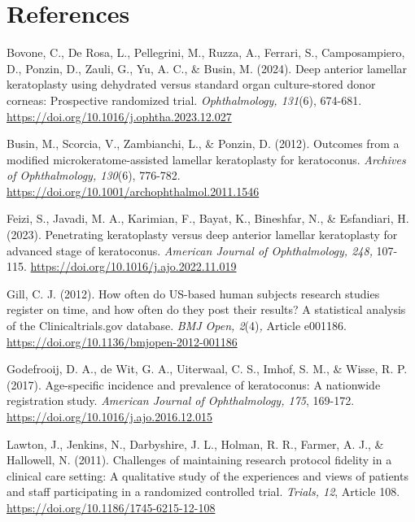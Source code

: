 \documentclass[authordate, reflection,issue]{jote-new-article}
\begin{document}
	\section{References}



	Bovone, C., De Rosa, L., Pellegrini, M., Ruzza, A., Ferrari, S., Camposampiero, D., Ponzin, D., Zauli, G., Yu, A. C., \& Busin, M. (2024). Deep anterior lamellar keratoplasty using dehydrated versus standard organ culture-stored donor corneas: Prospective randomized trial. \emph{Ophthalmology, 131}(6), 674-681. \url{https://doi.org/10.1016/j.ophtha.2023.12.027}



	Busin, M., Scorcia, V., Zambianchi, L., \& Ponzin, D. (2012). Outcomes from a modified microkeratome-assisted lamellar keratoplasty for keratoconus. \emph{Archives of Ophthalmology, 130}(6), 776-782. \url{https://doi.org/10.1001/archophthalmol.2011.1546}



	Feizi, S., Javadi, M. A., Karimian, F., Bayat, K., Bineshfar, N., \& Esfandiari, H. (2023). Penetrating keratoplasty versus deep anterior lamellar keratoplasty for advanced stage of keratoconus. \emph{American Journal of Ophthalmology, 248, }107-115. \url{https://doi.org/10.1016/j.ajo.2022.11.019}



	Gill, C. J. (2012). How often do US-based human subjects research studies register on time, and how often do they post their results? A statistical analysis of the Clinicaltrials.gov database. \emph{BMJ Open, 2}(4)\emph{, }Article e001186. \url{https://doi.org/10.1136/bmjopen-2012-001186}



	Godefrooij, D. A., de Wit, G. A., Uiterwaal, C. S., Imhof, S. M., \& Wisse, R. P. (2017). Age-specific incidence and prevalence of keratoconus: A nationwide registration study. \emph{American Journal of Ophthalmology, 175}, 169-172. \url{https://doi.org/10.1016/j.ajo.2016.12.015}



	Lawton, J., Jenkins, N., Darbyshire, J. L., Holman, R. R., Farmer, A. J., \& Hallowell, N. (2011). Challenges of maintaining research protocol fidelity in a clinical care setting: A qualitative study of the experiences and views of patients and staff participating in a randomized controlled trial. \emph{Trials, 12}, Article 108. \url{https://doi.org/10.1186/1745-6215-12-108}
\end{document}
